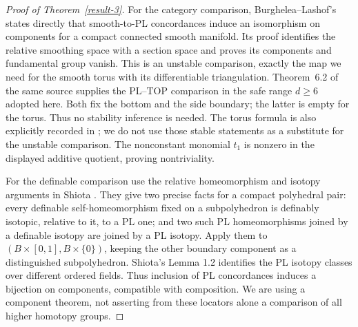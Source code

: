\documentclass[11pt,a4paper]{article}
\theoremstyle{definition}
\begin{document}
\begin{proof}[Proof of Theorem~\ref{result-3}]
For the category comparison, Burghelea--Lashof's
\cite[Theorem~6.1, p.~41; proof pp.~42--43]{BurgheleaLashof1974II}
states directly that smooth-to-PL concordances induce an
isomorphism on components for a compact connected smooth
manifold. Its proof identifies the relative smoothing space
with a section space and proves its components and fundamental
group vanish. This is an unstable comparison, exactly the map
we need for the smooth torus with its differentiable
triangulation. Theorem~6.2 of the same source supplies the
PL--TOP comparison in the safe range $d\geq6$ adopted here.
Both fix the bottom and the side boundary; the latter is empty
for the torus. Thus no stability inference is needed.
The torus formula is also explicitly recorded in
\cite[\S6.2, p.~34, equation~(6.12), Lemmas~6.16--6.17]{CourtePorcelli2025};
we do not use those stable statements as a substitute for the
unstable comparison.
The nonconstant monomial $t_1$ is nonzero in the displayed
additive quotient, proving nontriviality.

For the definable comparison use the relative homeomorphism and isotopy
arguments in Shiota \cite[Theorem 2.1 and its complement; Lemma 3.3,
proof of injectivity, pp.~44--46]{Shiota2010}. They give two precise
facts for a compact polyhedral pair: every definable self-homeomorphism
fixed on a subpolyhedron is definably isotopic, relative to it, to a PL
one; and two such PL homeomorphisms joined by a definable isotopy are
joined by a PL isotopy. Apply them to
$(B\times[0,1],B\times\{0\})$, keeping the other boundary component
as a distinguished subpolyhedron. Shiota's Lemma 1.2 identifies the
PL isotopy classes over different ordered fields. Thus inclusion of PL
concordances induces a bijection on components, compatible with
composition. We are using a component theorem, not asserting from
these locators alone a comparison of all higher homotopy groups.
\end{proof}
\end{document}
